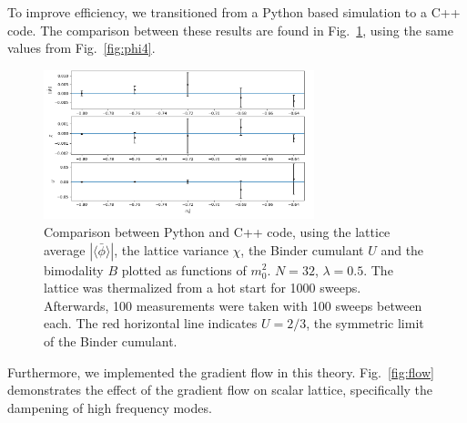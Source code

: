\documentclass[12pt]{report}
\begin{document}
To improve efficiency, we transitioned from a Python based simulation to a C++ code. The comparison between these results are found in Fig.~\ref{fig:compare}, using the same values from Fig.~\ref{fig:phi4}.

\begin{figure}[h]
  \centering
      \includegraphics[width=0.7\textwidth]{imgs/compare.png}
      \caption{Comparison between Python and C++ code, using the lattice average $|\langle\bar\phi\rangle|$, the lattice variance $\chi$, the Binder cumulant $U$ and the bimodality $B$ plotted as functions of $m_0^2$. $N=32$, $\lambda=0.5$. The lattice was thermalized from a hot start for 1000 sweeps. Afterwards, 100 measurements were taken with 100 sweeps between each. The red horizontal line indicates $U=2/3$, the symmetric limit of the Binder cumulant.}
  \label{fig:compare}
\end{figure}


Furthermore, we implemented the gradient flow in this theory. Fig.~\ref{fig:flow} demonstrates the effect of the gradient flow on scalar lattice, specifically the dampening of high frequency modes.
\end{document}
